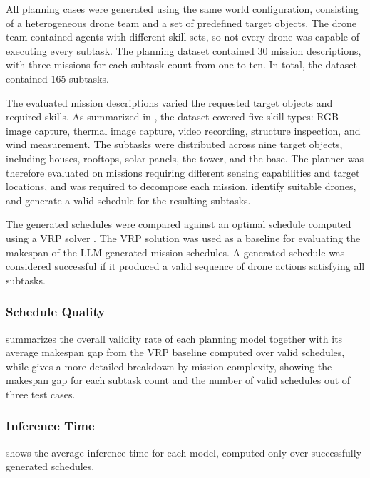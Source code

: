 All planning cases were generated using the same world configuration, consisting of a
heterogeneous drone team and a set of predefined target objects. The drone team contained
agents with different skill sets, so not every drone was capable of executing every subtask.
The planning dataset contained 30 mission descriptions, with three missions for each subtask
count from one to ten. In total, the dataset contained 165 subtasks.

The evaluated mission descriptions varied the requested target objects and required skills.
As summarized in , the dataset covered five skill
types: RGB image capture, thermal image capture, video recording, structure inspection, and
wind measurement. The subtasks were distributed across nine target objects, including houses,
rooftops, solar panels, the tower, and the base. The planner was therefore evaluated on
missions requiring different sensing capabilities and target locations, and was required to
decompose each mission, identify suitable drones, and generate a valid schedule for the
resulting subtasks.



The generated schedules were compared against an optimal schedule computed using a VRP solver
\cite{google_vrp}. The VRP solution was used as a baseline for evaluating the makespan of the
LLM-generated mission schedules. A generated schedule was considered successful if it produced a valid
sequence of drone actions satisfying all subtasks.

\subsubsection{Schedule Quality}
 summarizes the overall validity rate of each planning
model together with its average makespan gap from the VRP baseline computed over valid schedules,
while  gives a more detailed breakdown by mission
complexity, showing the makespan gap for each subtask count and the number of valid
schedules out of three test cases.





\subsubsection{Inference Time}
 shows the average inference time for each model, computed
only over successfully generated schedules.

